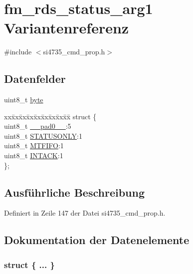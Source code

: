\hypertarget{unionfm__rds__status__arg1}{}\section{fm\+\_\+rds\+\_\+status\+\_\+arg1 Variantenreferenz}
\label{unionfm__rds__status__arg1}


{\ttfamily \#include $<$si4735\+\_\+cmd\+\_\+prop.\+h$>$}

\subsection*{Datenfelder}
\begin{DoxyCompactItemize}
\item 
uint8\+\_\+t \hyperlink{unionfm__rds__status__arg1_a96f44d20f1dbf1c8785a7bc99a46164c}{byte}
\item 
\begin{tabbing}
xx\=xx\=xx\=xx\=xx\=xx\=xx\=xx\=xx\=\kill
struct \{\\
\>uint8\_t \hyperlink{unionfm__rds__status__arg1_a8b4eebe79ded0459acec2f4950102ba3}{\_\_pad0\_\_}:5\\
\>uint8\_t \hyperlink{unionfm__rds__status__arg1_a696c0636e08a68f420bc7da0ae8aeed1}{STATUSONLY}:1\\
\>uint8\_t \hyperlink{unionfm__rds__status__arg1_a3490701acd7d75adf4ecbe2192e9fcfd}{MTFIFO}:1\\
\>uint8\_t \hyperlink{unionfm__rds__status__arg1_adf4f80d8fb205d6c93c6423d84d63d9c}{INTACK}:1\\
\}; \\

\end{tabbing}\end{DoxyCompactItemize}


\subsection{Ausführliche Beschreibung}


Definiert in Zeile 147 der Datei si4735\+\_\+cmd\+\_\+prop.\+h.



\subsection{Dokumentation der Datenelemente}
\hypertarget{unionfm__rds__status__arg1_a7b2fa8bec1a25bdb1ddbd086beec54ba}{}\subsubsection[{"@21}]{\setlength{\rightskip}{0pt plus 5cm}struct \{ ... \} }\label{unionfm__rds__status__arg1_a7b2fa8bec1a25bdb1ddbd086beec54ba}
\hypertarget{unionfm__rds__status__arg1_a8b4eebe79ded0459acec2f4950102ba3}{}

